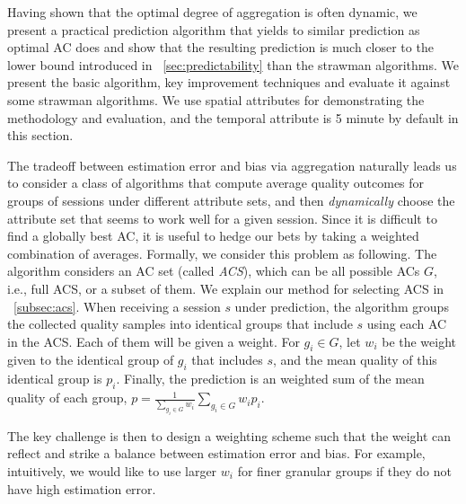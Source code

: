\label{sec:prediction}

Having shown that the optimal degree of aggregation is often dynamic, we present a practical prediction algorithm that yields to similar prediction as optimal AC does and show that the resulting prediction is much closer to the lower bound introduced in \Section~\ref{sec:predictability} than the strawman algorithms. We present the basic algorithm, key improvement techniques and evaluate it against some strawman algorithms. We use spatial attributes for demonstrating the methodology and evaluation, and the temporal attribute is 5 minute by default in this section.

The tradeoff between estimation error and bias via aggregation naturally leads us to consider a class of algorithms that compute average quality outcomes for groups of sessions under different attribute sets, and then {\it dynamically} choose the attribute set that seems to work well for a given session.  Since it is difficult to find a globally best AC, it is useful to hedge our bets by taking a weighted combination of averages.  Formally, we consider this problem as following. The algorithm considers an AC set (called {\it ACS}), which can be all possible ACs $G$, i.e., full ACS, or a subset of them. We explain our method for selecting ACS in \Section~\ref{subsec:acs}. When receiving a session $s$ under prediction, the algorithm groups the collected quality samples into identical groups that include $s$ using each AC in the ACS. Each of them will be given a weight. For $g_i\in G$, let $w_i$ be the weight given to the identical group of $g_i$ that includes $s$, and the mean quality of this identical group is $p_i$. 
Finally, the prediction is an weighted sum of the mean quality of each group, $p=\frac{1}{\sum_{g_i\in G} w_i}\sum_{g_i\in G} w_ip_i$.

The key challenge is then to design a weighting scheme such that the weight can reflect and strike a balance between estimation error and bias. For example, intuitively, we would like to use larger $w_i$ for finer granular groups if they do not have high estimation error. 



